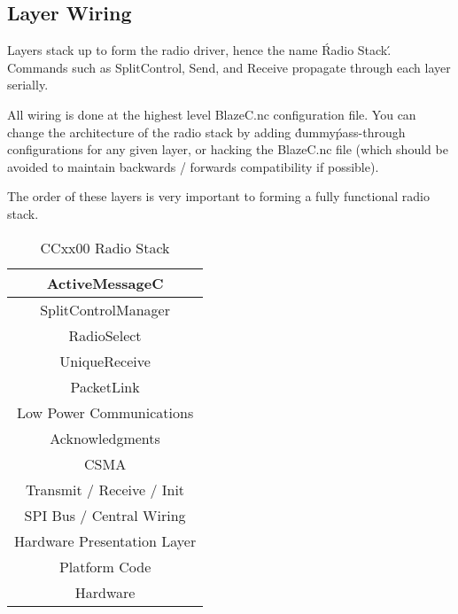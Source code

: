 \documentclass{article}
\begin{document}
\subsection{Layer Wiring}
Layers stack up to form the radio driver, hence the name \'Radio Stack\'. Commands
such as SplitControl, Send, and Receive propagate through each layer serially.

All wiring is done at the highest level BlazeC.nc configuration file. You can 
change the architecture of the radio stack by adding \'dummy\' pass-through configurations
for any given layer, or hacking the BlazeC.nc file (which should be avoided to maintain
backwards / forwards compatibility if possible).

The order of these layers is very important to forming a fully functional radio stack.

\begin{table}
	\centering
		\begin{tabular}{|c|}
		  \hline
      ActiveMessageC \\ \hline \hline
      SplitControlManager \\ \hline
      RadioSelect \\ \hline
      UniqueReceive \\ \hline
      PacketLink \\ \hline
      Low Power Communications \\ \hline
      Acknowledgments \\ \hline
      CSMA \\ \hline \hline
      Transmit / Receive / Init \\ \hline
      SPI Bus / Central Wiring \\ \hline
      \hline
      Hardware Presentation Layer \\ \hline
      Platform Code \\ \hline
      \hline
      Hardware \\
      \hline
      
   	\end{tabular}
	\caption{CCxx00 Radio Stack}
	\label{tab:CCxx00RadioStack}
\end{table}
\end{document}
